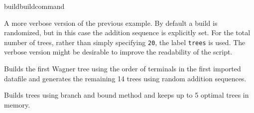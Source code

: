 \begin{command}{build}{buildcommand}
\begin{poyexamples}
            {A more verbose version of the previous example. By default a build
            is randomized, but in this case the addition sequence is explicitly
            set. For the total number of trees, rather than simply specifying \texttt{20},
            the label \texttt{trees} is used. The verbose version might be desirable
            to improve the readability of the script.}

            {Builds the first Wagner tree using the order of terminals in the first
            imported datafile and generates the remaining
            14 trees using random addition sequences.}
            
            {Builds trees using branch and bound method and keeps up to
            5 optimal trees in memory.}
                    
	\end{poyexamples}

\end{command}



